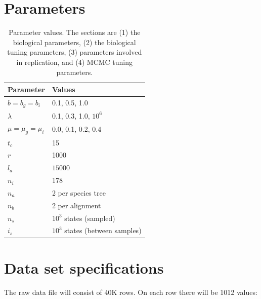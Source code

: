 \documentclass{article}
\begin{document}
\section{Parameters}

\begin{table}
  \centering 
  \begin{tabular}{l l}
    \hline
    Parameter             & Values \\
    \hline
    \hline
    $b = b_g = b_i$       & 0.1, 0.5, 1.0 \\
    $\lambda$             & 0.1, 0.3, 1.0, $10^6$ \\
    $\mu = \mu_g = \mu_i$ & 0.0, 0.1, 0.2, 0.4 \\
    \hline
    $t_c$                 & 15 \\
    $r$                   & 1000 \\
    $l_a$                 & $15000$ \\
    \hline
    $n_i$                 & 178 \\
    $n_a$                 & 2 per species tree\\
    $n_b$                 & 2 per alignment\\
    \hline
    $n_s$                 & $10^3$ states (sampled)\\
    $i_s$                 & $10^3$ states (between samples)\\
    \hline
  \end{tabular}
  \caption{
    Parameter values. The sections are (1) the biological parameters, (2) the
    biological tuning parameters, (3) parameters involved in replication, 
    and (4) MCMC tuning parameters.
  }
  \label{table:parameter_values}
\end{table}

\section{Data set specifications}

The raw data file will consist of 40K rows. On each row there will be 1012 values:
\end{document}
